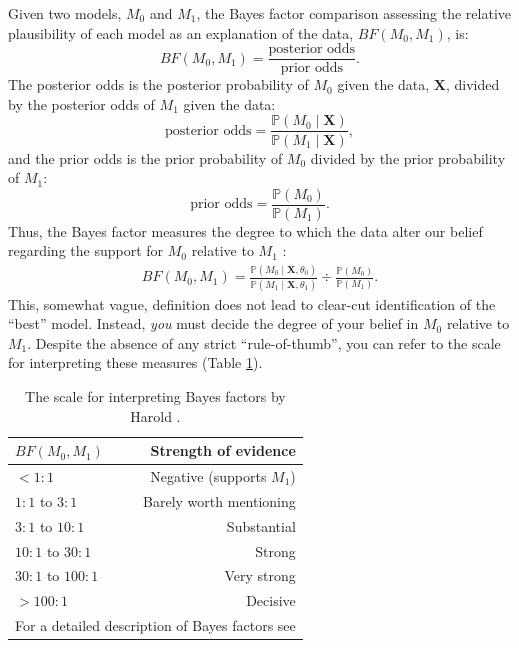 \documentclass[11pt]{article}
\begin{document}
Given two models, $M_0$ and $M_1$, the Bayes factor comparison assessing the relative plausibility of each model as an explanation of the data, $BF(M_0,M_1)$, is:
$$BF(M_0,M_1) = \frac{\mbox{posterior odds}}{\mbox{prior odds}}.$$
The posterior odds is the posterior probability of $M_0$ given the data, $\mathbf X$, divided by the posterior odds of $M_1$ given the data:
$$\mbox{posterior odds} = \frac{\mathbb{P}(M_0 \mid \mathbf X)}{\mathbb{P}(M_1 \mid \mathbf X)},$$
and the prior odds is the prior probability of $M_0$ divided by the prior probability of $M_1$:
$$\mbox{prior odds} = \frac{\mathbb{P}(M_0)}{\mathbb{P}(M_1)}.$$
Thus, the Bayes factor measures the degree to which the data alter our belief regarding the support for $M_0$ relative to $M_1$ \citep{lavine99}:
\begin{align}\label{BFeq1}
BF(M_0,M_1) = \frac{\mathbb{P}(M_0 \mid \mathbf X, \theta_0)}{\mathbb{P}(M_1 \mid \mathbf X, \theta_1)} \div \frac{\mathbb{P}(M_0)}{\mathbb{P}(M_1)}. 
\end{align}
This, somewhat vague, definition does not lead to clear-cut identification of the ``best'' model. Instead, \textsl{you} must decide the degree of your belief in $M_0$ relative to $M_1$. 
Despite the absence of any strict ``rule-of-thumb'', you can refer to the scale \citep[outlined by][]{jeffreys61} for interpreting these measures (Table \ref{bftable}).
\begin{table}[h]
\centering
\caption{\small The scale for interpreting Bayes factors by Harold \citet{jeffreys61}.} 
\label{bftable}
\begin{tabular}{l c r}
\hline
\multicolumn{1}{l}{\textbf{$BF(M_0, M_1)$}} & \multicolumn{1}{r}{ } &\multicolumn{1}{r}{{Strength of evidence}} \\ 
\hline
$<1:1$ & \hspace{8mm} & Negative (supports $M_1$)\\
$1:1$ to $3:1$ & & Barely worth mentioning\\
$3:1$ to $10:1$ & & Substantial\\
$10:1$ to $30:1$ & & Strong\\
$30:1$ to $100:1$ & & Very strong\\
$>100:1$ & & Decisive\\
\hline
\multicolumn{3}{l}{{\scriptsize{For a detailed description of Bayes factors see \citet{kass95}}}} 
\end{tabular}
\end{table}
\end{document}
